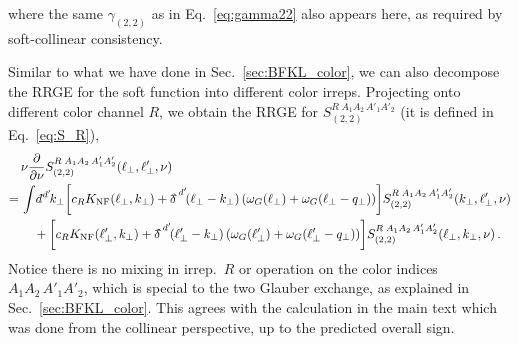 \documentclass[letterpaper,11pt]{article}
\newcommand{\eq}[1]{Eq.~\eqref{eq:#1}}
\renewcommand{\sec}[1]{Sec.~\ref{sec:#1}}
\newcommand{\deltaslash}{{\delta\!\!\!{}^-}}
\newcommand{\nn}{\nonumber}
\newcommand\prnth[1]{\left(#1\right)}
\newcommand{\dbar}{d\hspace*{-0.08em}\bar{}\hspace*{0.1em}}
\begin{document}
where the same $\gamma_{(2,2)}$ as in \eq{gamma22} also appears here, as required by soft-collinear consistency.


Similar to what we have done in \sec{BFKL_color}, we can also decompose the RRGE for the soft function into different color irreps.
Projecting onto different color channel $R$, we obtain the RRGE for $S_{(2,2)}^{R\;A_1A_2\,A'_1A'_2}$ (it is defined in \eq{S_R}),
\begin{align} \label{eq:softRRGE_R}
 &\nu\frac{\partial}{\partial \nu}S_{(2,2)}^{R\; A_1 A_2\,A'_1 A'_2}(\ell_\perp,\ell'_\perp,\nu) \\
 =\,& \int\! \dbar^{d'}\!k_\perp \biggl[ c_R  K_\text{NF}(\ell_\perp, k_\perp)
+ \deltaslash^{d'}\!(\ell_\perp- k_\perp) \prnth{\omega_G(\ell_\perp) + \omega_G(\ell_\perp-q_\perp)} \biggr]
S_{(2,2)}^{R\; A_1 A_2\,A'_1 A'_2}(k_\perp,\ell'_\perp,\nu)
\nn\\
&\quad+\biggl[ c_R  K_\text{NF}(\ell'_\perp, k_\perp)
+ \deltaslash^{d'}\!(\ell'_\perp- k_\perp) \prnth{\omega_G(\ell'_\perp) + \omega_G(\ell'_\perp-q_\perp)} \biggr]
S_{(2,2)}^{R\; A_1 A_2\,A'_1 A'_2}(\ell_\perp,k_\perp,\nu)
\nn\,.
\end{align}
Notice there is no mixing in irrep.~$R$ or operation on the color indices $A_1 A_2\, A'_1 A'_2$, which is special to the two Glauber exchange, as explained in \sec{BFKL_color}. This agrees with the calculation in the main text which was done from the collinear perspective, up to the predicted overall sign.



\end{document}
